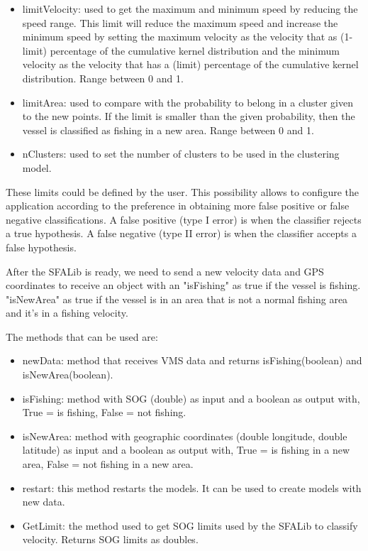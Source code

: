 \begin{itemize}
\item limitVelocity: used to get the maximum and minimum speed by reducing the speed range. This limit will reduce the maximum speed and increase the minimum speed by setting the maximum velocity as the velocity that as (1-limit) percentage of the cumulative kernel distribution and the minimum velocity as the velocity that has a (limit) percentage of the cumulative kernel distribution. Range between 0 and 1.
\item limitArea: used to compare with the probability to belong in a cluster given to the new points. If the limit is smaller than the given probability, then the vessel is classified as fishing in a new area. Range between 0 and 1.
\item nClusters: used to set the number of clusters to be used in the clustering model.
\end{itemize}
These limits could be defined by the user. This possibility allows to configure the application according to the preference in obtaining more false positive or false negative classifications.
A false positive (type I error) is when the classifier rejects a true hypothesis.
A false negative (type II error) is when the classifier accepts a false hypothesis.

After the SFALib is ready, we need to send a new velocity data and GPS coordinates to receive an object with an "isFishing" as true if the vessel is fishing. "isNewArea" as true if the vessel is in an area that is not a normal fishing area and it's in a fishing velocity.

The methods that can be used are:
\begin{itemize}
\item newData: method that receives VMS data and returns isFishing(boolean) and isNewArea(boolean).
\item isFishing: method with SOG (double) as input and a boolean as output with, True = is fishing, False = not fishing.
\item isNewArea: method with geographic coordinates (double longitude, double latitude) as input and a boolean as output with, True = is fishing in a new area, False = not fishing in a new area.
\item restart: this method restarts the models. It can be used to create models with new data.
\item GetLimit: the method used to get SOG limits used by the SFALib to classify velocity. Returns SOG limits as doubles.
\end{itemize}






